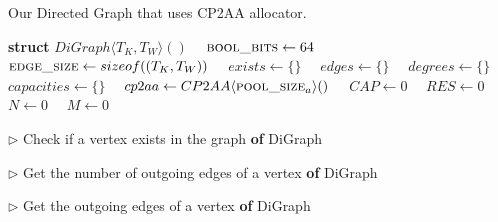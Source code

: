 \begin{algorithm}[hbtp]
\caption{Our Directed Graph that uses CP2AA allocator.}
\label{alg:digraph1}
\begin{algorithmic}[1]

\Statex

\State \textbf{struct} $DiGraph \langle T_K, T_W \rangle ()$ \label{alg:digraph--struct-begin}
\State \ \ $\textsc{bool\_bits} \gets 64$ 
\State \ \ $\textsc{edge\_size} \gets sizeof((T_K, T_W))$ 
\State \ \ $exists \gets \{\}$ 
\State \ \ $edges \gets \{\}$ 
\State \ \ $degrees \gets \{\}$ 
\State \ \ $capacities \gets \{\}$ 
\State \ \ $cp2aa \gets CP2AA \langle \textsc{pool\_size}_a \rangle ()$ 
\State \ \ $CAP \gets 0$ 
\State \ \ $RES \gets 0$ 
\State \ \ $N \gets 0$ 
\State \ \ $M \gets 0$  \label{alg:digraph--struct-end}

\Statex

\State $\rhd$ Check if a vertex exists in the graph
 \textbf{of} DiGraph \label{alg:digraph--has-vertex-begin}
\EndFunction \label{alg:digraph--has-vertex-end}

\Statex

\State $\rhd$ Get the number of outgoing edges of a vertex
 \textbf{of} DiGraph \label{alg:digraph--degree-begin}
\EndFunction \label{alg:digraph--degree-end}

\Statex

\State $\rhd$ Get the outgoing edges of a vertex
 \textbf{of} DiGraph \label{alg:digraph--edges-begin}
\EndFunction \label{alg:digraph--edges-end}

\Statex


\end{algorithmic}
\end{algorithm}
